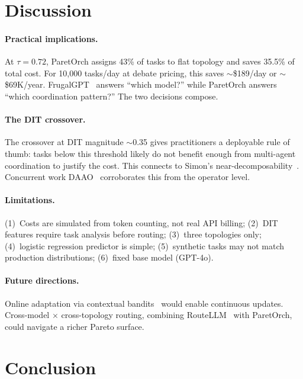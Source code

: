 \documentclass{article}
\begin{document}
\section{Discussion}
\label{sec:discussion}

\paragraph{Practical implications.} At $\tau = 0.72$, ParetOrch assigns 43\% of tasks to flat topology and saves 35.5\% of total cost. For 10,000 tasks/day at debate pricing, this saves ${\sim}$\$189/day or ${\sim}$\$69K/year. FrugalGPT~\cite{chen2023frugalgpt} answers ``which model?'' while ParetOrch answers ``which coordination pattern?'' The two decisions compose.

\paragraph{The DIT crossover.} The crossover at DIT magnitude ${\sim}$0.35 gives practitioners a deployable rule of thumb: tasks below this threshold likely do not benefit enough from multi-agent coordination to justify the cost. This connects to Simon's near-decomposability~\cite{simon1962complexity}. Concurrent work DAAO~\cite{su2025daao} corroborates this from the operator level.

\paragraph{Limitations.} (1)~Costs are simulated from token counting, not real API billing; (2)~DIT features require task analysis before routing; (3)~three topologies only; (4)~logistic regression predictor is simple; (5)~synthetic tasks may not match production distributions; (6)~fixed base model (GPT-4o).

\paragraph{Future directions.} Online adaptation via contextual bandits~\cite{agrawal2013contextual_ts} would enable continuous updates. Cross-model $\times$ cross-topology routing, combining RouteLLM~\cite{ong2024routellm} with ParetOrch, could navigate a richer Pareto surface.

\section{Conclusion}
\label{sec:conclusion}
\end{document}
